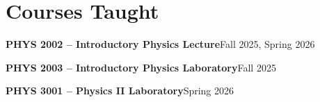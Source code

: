 \section{Courses Taught}
\vspace{6pt}

{\setlength{\parskip}{0pt}
\noindent\textbf{PHYS 2002 -- Introductory Physics Lecture}\hfill Fall 2025, Spring 2026\par
\noindent\textbf{PHYS 2003 -- Introductory Physics Laboratory}\hfill Fall 2025\par
\noindent\textbf{PHYS 3001 -- Physics II Laboratory}\hfill Spring 2026\par
}
